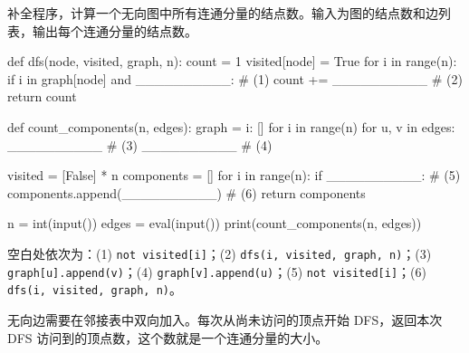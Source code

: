 \begin{question}[连通分量大小]
补全程序，计算一个无向图中所有连通分量的结点数。输入为图的结点数和边列表，输出每个连通分量的结点数。

\begin{pycode}
def dfs(node, visited, graph, n):
    count = 1
    visited[node] = True
    for i in range(n):
        if i in graph[node] and __________:     # (1)
            count += __________                 # (2)
    return count


def count_components(n, edges):
    graph = {i: [] for i in range(n)}
    for u, v in edges:
        __________                              # (3)
        __________                              # (4)

    visited = [False] * n
    components = []
    for i in range(n):
        if __________:                          # (5)
            components.append(__________)       # (6)
    return components


n = int(input())
edges = eval(input())
print(count_components(n, edges))
\end{pycode}
\begin{solution}
空白处依次为：(1) \texttt{not visited[i]}；(2) \texttt{dfs(i, visited, graph, n)}；(3) \texttt{graph[u].append(v)}；(4) \texttt{graph[v].append(u)}；(5) \texttt{not visited[i]}；(6) \texttt{dfs(i, visited, graph, n)}。

无向边需要在邻接表中双向加入。每次从尚未访问的顶点开始 DFS，返回本次 DFS 访问到的顶点数，这个数就是一个连通分量的大小。
\end{solution}
\end{question}
